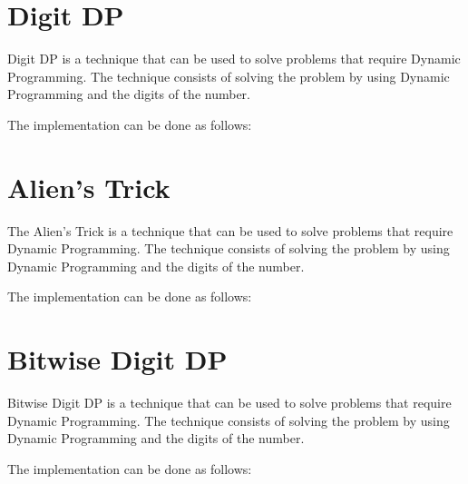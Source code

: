 

\section{Digit DP}

Digit DP is a technique that can be used to solve problems that require Dynamic Programming. The technique consists of solving the problem by using Dynamic Programming and the digits of the number.

The implementation can be done as follows:



\section{Alien's Trick}

The Alien's Trick is a technique that can be used to solve problems that require Dynamic Programming. The technique consists of solving the problem by using Dynamic Programming and the digits of the number.

The implementation can be done as follows:



\section{Bitwise Digit DP}

Bitwise Digit DP is a technique that can be used to solve problems that require Dynamic Programming. The technique consists of solving the problem by using Dynamic Programming and the digits of the number.

The implementation can be done as follows:





